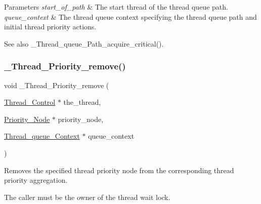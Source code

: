 \begin{DoxyParams}{Parameters}
{\em start\+\_\+of\+\_\+path} & The start thread of the thread queue path. \\
\hline
{\em queue\+\_\+context} & The thread queue context specifying the thread queue path and initial thread priority actions.\\
\hline
\end{DoxyParams}
\begin{DoxySeeAlso}{See also}
\+\_\+\+Thread\+\_\+queue\+\_\+\+Path\+\_\+acquire\+\_\+critical(). 
\end{DoxySeeAlso}
\mbox{\label{group__RTEMSScoreThread_ga8c1e1030ce5bea3614f62e8be650bbeb}} 
\subsubsection{\texorpdfstring{\_Thread\_Priority\_remove()}{\_Thread\_Priority\_remove()}}
{\footnotesize\ttfamily void \+\_\+\+Thread\+\_\+\+Priority\+\_\+remove (\begin{DoxyParamCaption}\item[{\mbox{\hyperlink{struct__Thread__Control}{Thread\+\_\+\+Control}} $\ast$}]{the\+\_\+thread,  }\item[{\mbox{\hyperlink{structPriority__Node}{Priority\+\_\+\+Node}} $\ast$}]{priority\+\_\+node,  }\item[{\mbox{\hyperlink{structThread__queue__Context}{Thread\+\_\+queue\+\_\+\+Context}} $\ast$}]{queue\+\_\+context }\end{DoxyParamCaption})}



Removes the specified thread priority node from the corresponding thread priority aggregation. 

The caller must be the owner of the thread wait lock.


